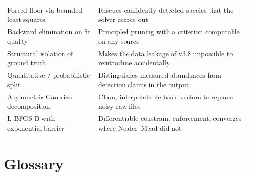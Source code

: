 \documentclass[11pt,a4paper]{article}
\begin{document}
\begin{longtable}{@{}L{5.0cm}L{10.0cm}@{}}
Forced-floor via bounded least squares &
Rescues confidently detected species that the solver zeroes out \\
Backward elimination on fit quality &
Principled pruning with a criterion computable on any source \\
Structural isolation of ground truth &
Makes the data leakage of v3.8 impossible to reintroduce accidentally \\
Quantitative / probabilistic split &
Distinguishes measured abundances from detection claims in the output \\
Asymmetric Gaussian decomposition &
Clean, interpolatable basis vectors to replace noisy raw files \\
L-BFGS-B with exponential barrier &
Differentiable constraint enforcement; converges where Nelder--Mead did not \\
\bottomrule
\end{longtable}
\normalsize

\section{Glossary}
\end{document}

